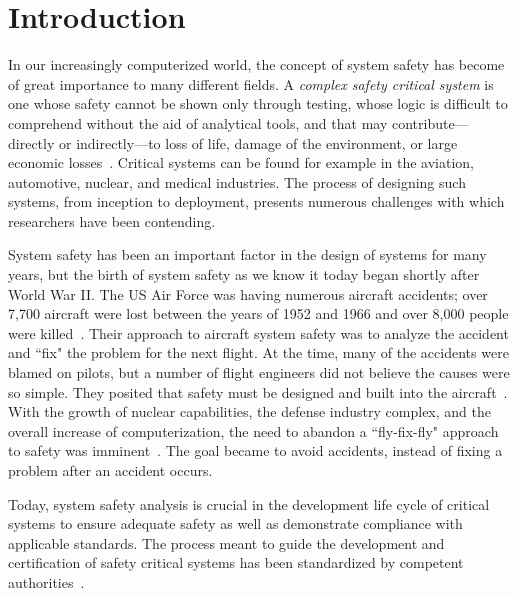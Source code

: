 \chapter{Introduction}
\label{chap:intro}
In our increasingly computerized world, the concept of system safety has become of great importance to many different fields. A \emph{complex safety critical system} is one whose safety cannot be shown only through testing, whose logic is difficult to comprehend without the aid of analytical tools, and that may contribute---directly or indirectly---to loss of life, damage of the environment, or large economic losses~\cite{SAE}. Critical systems can be found for example in the aviation, automotive, nuclear, and medical industries.  The process of designing such systems, from inception to deployment, presents numerous challenges with which researchers have been contending. 

System safety has been an important factor in the design of systems for many years, but the birth of system safety as we know it today began shortly after World War II. The US Air Force was having numerous aircraft accidents; over 7,700 aircraft were lost between the years of 1952 and 1966 and over 8,000 people were killed~\cite{hammer}. Their approach to aircraft system safety was to analyze the accident and ``fix" the problem for the next flight. At the time, many of the accidents were blamed on pilots, but a number of flight engineers did not believe the causes were so simple. They posited that safety must be designed and built into the aircraft~\cite{levesonWhitePaper}. With the growth of nuclear capabilities, the defense industry complex, and the overall increase of computerization, the need to abandon a ``fly-fix-fly" approach to safety was imminent~\cite{miller1954applying, levesonWhitePaper, hammer}. The goal became to avoid accidents, instead of fixing a problem after an accident occurs.

Today, system safety analysis is crucial in the development life cycle of critical systems to ensure adequate safety as well as demonstrate compliance with applicable standards. The process meant to guide the development and certification of safety critical systems has been standardized by competent authorities~\cite{SAE,SAE:ARP4761,SAE:ARP4754A}.


